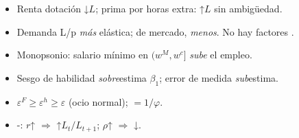 \documentclass{article}
\begin{document}
\begin{columnas}
\begin{trampa}
\begin{itemize}
\item Renta dotación ↓$L$; prima por horas extra: ↑$L$ sin ambigüedad.
\item Demanda L/p \emph{más} elástica; de mercado, \emph{menos}. No hay factores .
\item Monopsonio: salario mínimo en $(w^M,w^c]$ \emph{sube} el empleo.
\item Sesgo de habilidad \emph{sobre}estima $\beta_1$; error de medida \emph{sub}estima.
\item $\varepsilon^F\geq\varepsilon^h\geq\varepsilon$ (ocio normal);  $=1/\varphi$.
\item {}-: $r$↑ $\Rightarrow$ ↑$L_t/L_{t+1}$; $\rho$↑ $\Rightarrow$ ↓.
\end{itemize}
\end{trampa}

\end{columnas}
\end{document}
